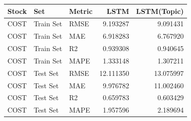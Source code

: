 \begin{tabular}{lllrr}
\toprule
Stock & Set & Metric & LSTM & LSTM(Topic) \\
\midrule
COST & Train Set & RMSE & 9.193287 & 9.091431 \\
COST & Train Set & MAE & 6.918283 & 6.767920 \\
COST & Train Set & R2 & 0.939308 & 0.940645 \\
COST & Train Set & MAPE & 1.333148 & 1.307211 \\
COST & Test Set & RMSE & 12.111350 & 13.075997 \\
COST & Test Set & MAE & 9.976782 & 11.002460 \\
COST & Test Set & R2 & 0.659783 & 0.603429 \\
COST & Test Set & MAPE & 1.957596 & 2.189694 \\
\bottomrule
\end{tabular}

